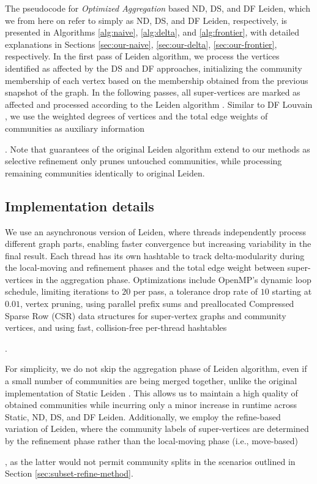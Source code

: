 The pseudocode for \textit{Optimized Aggregation} based ND, DS, and DF Leiden, which we from here on refer to simply as ND, DS, and DF Leiden, respectively, is presented in Algorithms \ref{alg:naive}, \ref{alg:delta}, and \ref{alg:frontier}, with detailed explanations in Sections \ref{sec:our-naive}, \ref{sec:our-delta}, \ref{sec:our-frontier}, respectively. In the first pass of Leiden algorithm, we process the vertices identified as affected by the DS and DF approaches, initializing the community membership of each vertex based on the membership obtained from the previous snapshot of the graph. In the following passes, all super-vertices are marked as affected and processed according to the Leiden algorithm \cite{sahu2024shared}. Similar to DF Louvain \cite{sahu2024dflouvain}, we use the weighted degrees of vertices and the total edge weights of communities as auxiliary information \cite{sahu2024dflouvain}. Note that guarantees of the original Leiden algorithm \cite{com-traag19} extend to our methods as selective refinement only prunes untouched communities, while processing remaining communities identically to original Leiden.




\subsection{Implementation details}
\label{sec:implementation-details}

We use an asynchronous version of Leiden, where threads independently process different graph parts, enabling faster convergence but increasing variability in the final result. Each thread has its own hashtable to track delta-modularity during the local-moving and refinement phases and the total edge weight between super-vertices in the aggregation phase. Optimizations include OpenMP's dynamic loop schedule, limiting iterations to $20$ per pass, a tolerance drop rate of $10$ starting at $0.01$, vertex pruning, using parallel prefix sums and preallocated Compressed Sparse Row (CSR) data structures for super-vertex graphs and community vertices, and using fast, collision-free per-thread hashtables \cite{sahu2024fast}.

For simplicity, we do not skip the aggregation phase of Leiden algorithm, even if a small number of communities are being merged together, unlike the original implementation of Static Leiden \cite{sahu2024fast}. This allows us to maintain a high quality of obtained communities while incurring only a minor increase in runtime across Static, ND, DS, and DF Leiden. Additionally, we employ the refine-based variation of Leiden, where the community labels of super-vertices are determined by the refinement phase rather than the local-moving phase (i.e., move-based), as the latter would not permit community splits in the scenarios outlined in Section \ref{sec:subset-refine-method}.


